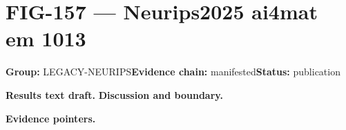\clearpage
\section{FIG-157 --- Neurips2025 ai4mat em 1013}
\label{figpage:fig-157}
\textbf{Group:} LEGACY-NEURIPS\quad \textbf{Evidence chain:} manifested\quad \textbf{Status:} publication

\textbf{Results text draft.} 
\textbf{Discussion and boundary.} 


\textbf{Evidence pointers.}



\vfill
